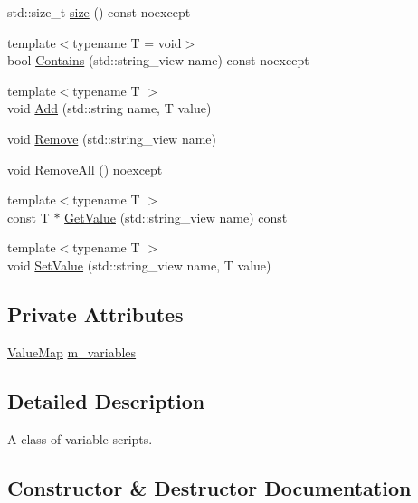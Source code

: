\begin{DoxyCompactItemize}
\item 
std\+::size\+\_\+t \mbox{\hyperlink{classmage_1_1_variable_script_a78e4981b7a7ad4dc03a3b804b468d560}{size}} () const noexcept
\item 
{\footnotesize template$<$typename T  = void$>$ }\\bool \mbox{\hyperlink{classmage_1_1_variable_script_a85e55182a21997276851470d41e96476}{Contains}} (std\+::string\+\_\+view name) const noexcept
\item 
{\footnotesize template$<$typename T $>$ }\\void \mbox{\hyperlink{classmage_1_1_variable_script_aa9890d4635f28c3f9de29366f4ea1238}{Add}} (std\+::string name, T value)
\item 
void \mbox{\hyperlink{classmage_1_1_variable_script_ae35166708b02796a9d954ce7c607898d}{Remove}} (std\+::string\+\_\+view name)
\item 
void \mbox{\hyperlink{classmage_1_1_variable_script_add51955d83e85e6d6acd82cfe40bed26}{Remove\+All}} () noexcept
\item 
{\footnotesize template$<$typename T $>$ }\\const T $\ast$ \mbox{\hyperlink{classmage_1_1_variable_script_a034f0945d6d7dbb60de0e53929f692f8}{Get\+Value}} (std\+::string\+\_\+view name) const
\item 
{\footnotesize template$<$typename T $>$ }\\void \mbox{\hyperlink{classmage_1_1_variable_script_abf23e2fd9c2344405cb8c9e3b44af62c}{Set\+Value}} (std\+::string\+\_\+view name, T value)
\end{DoxyCompactItemize}
\subsection*{Private Attributes}
\begin{DoxyCompactItemize}
\item 
\mbox{\hyperlink{namespacemage_a3a4b59e486babe3ec78455f9ee0d4beb}{Value\+Map}} \mbox{\hyperlink{classmage_1_1_variable_script_ab17ba4288d67867540940b0c947ad65b}{m\+\_\+variables}}
\end{DoxyCompactItemize}


\subsection{Detailed Description}
A class of variable scripts. 

\subsection{Constructor \& Destructor Documentation}
\mbox{\label{classmage_1_1_variable_script_a996678899f4ffdaa94ad9a4dcd441d1c}} 
